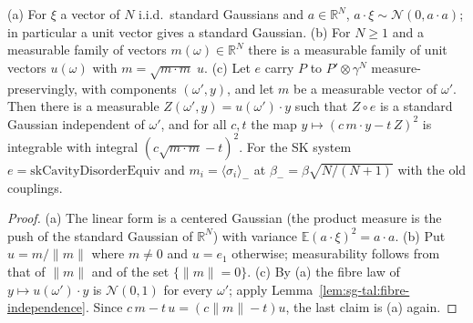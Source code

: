 \begin{lemma}
\label{lem:sg-tal:gaussian-projection}
  \leanok
{}
(a) For $\xi$ a vector of $N$ i.i.d.\ standard Gaussians and $a\in\mathbb R^N$, $a\cdot\xi\sim\mathcal N(0,a\cdot a)$; in particular a unit vector gives a standard Gaussian.
(b) For $N\ge1$ and a measurable family of vectors $m(\omega)\in\mathbb R^N$ there is a measurable family of unit vectors $u(\omega)$ with $m=\sqrt{m\cdot m}\;u$.
(c) Let $e$ carry $P$ to $P'\otimes\gamma^N$ measure-preservingly, with components $(\omega',y)$, and let $m$ be a measurable vector of $\omega'$.  Then there is a measurable $Z(\omega',y)=u(\omega')\cdot y$ such that $Z\circ e$ is a standard Gaussian independent of $\omega'$, and for all $c,t$ the map $y\mapsto(c\,m\cdot y-t\,Z)^2$ is integrable with integral $(c\sqrt{m\cdot m}-t)^2$.
For the SK system $e=\mathrm{skCavityDisorderEquiv}$ and $m_i=\langle\sigma_i\rangle_-$ at $\beta_-=\beta\sqrt{N/(N+1)}$ with the old couplings.
\end{lemma}
\begin{proof}
  \leanok
(a) The linear form is a centered Gaussian (the product measure is the push of the standard Gaussian of $\mathbb R^N$) with variance $\mathbb E(a\cdot\xi)^2=a\cdot a$.  (b) Put $u=m/\|m\|$ where $m\ne0$ and $u=e_1$ otherwise; measurability follows from that of $\|m\|$ and of the set $\{\|m\|=0\}$.  (c) By (a) the fibre law of $y\mapsto u(\omega')\cdot y$ is $\mathcal N(0,1)$ for every $\omega'$; apply Lemma~\ref{lem:sg-tal:fibre-independence}.  Since $c\,m-t\,u=(c\|m\|-t)u$, the last claim is (a) again.
\end{proof}

